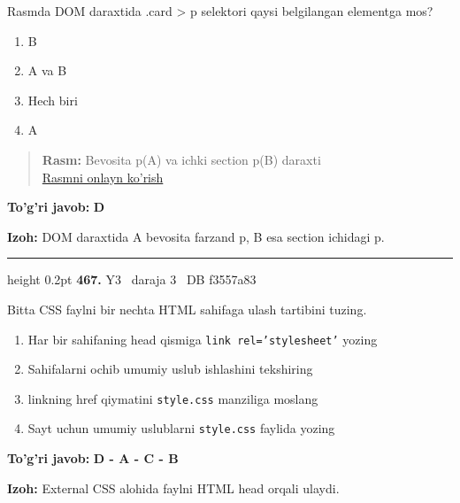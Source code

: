 \documentclass[10pt,a4paper,oneside]{article}
\begin{document}
\par
Rasmda DOM daraxtida .card \textgreater{} p selektori qaysi belgilangan elementga mos?
\begin{enumerate}[label=\Alph*),leftmargin=9mm]
\item B
\item A va B
\item Hech biri
\item A
\end{enumerate}
\begin{quote}\footnotesize\color{muted}\textbf{Rasm:} Bevosita p(A) va ichki section p(B) daraxti\\
\href{https://github.com/sarvar9417/attestatsiya/blob/main/public/graphics-web-v2/dom_tree.svg}{Rasmni onlayn ko'rish}
\end{quote}
\begin{tcolorbox}[enhanced,breakable,colback=teal!4,colframe=teal!45!black,boxrule=0.45pt,arc=1.2mm,left=2.8mm,right=2.8mm,top=2mm,bottom=2mm,before skip=2mm,after skip=2mm]
\textbf{\color{teal}To'g'ri javob:} \textbf{D}
\par\smallskip
\textbf{Izoh:} DOM daraxtida A bevosita farzand p, B esa section ichidagi p.
\end{tcolorbox}
\vspace{2mm}\hrule height 0.2pt \vspace{4mm}
\hypertarget{q467}{\textbf{\color{ink}467.}}  {\color{muted}\scriptsize Y3 \textbullet\ daraja 3 \textbullet\ DB f3557a83}
\par
Bitta CSS faylni bir nechta HTML sahifaga ulash tartibini tuzing.
\begin{enumerate}[label=\Alph*),leftmargin=9mm]
\item Har bir sahifaning head qismiga \texttt{link rel='stylesheet'} yozing
\item Sahifalarni ochib umumiy uslub ishlashini tekshiring
\item linkning href qiymatini \texttt{style.css} manziliga moslang
\item Sayt uchun umumiy uslublarni \texttt{style.css} faylida yozing
\end{enumerate}
\begin{tcolorbox}[enhanced,breakable,colback=teal!4,colframe=teal!45!black,boxrule=0.45pt,arc=1.2mm,left=2.8mm,right=2.8mm,top=2mm,bottom=2mm,before skip=2mm,after skip=2mm]
\textbf{\color{teal}To'g'ri javob:} \textbf{D - A - C - B}
\par\smallskip
\textbf{Izoh:} External CSS alohida faylni HTML head orqali ulaydi.
\end{tcolorbox}
\end{document}
